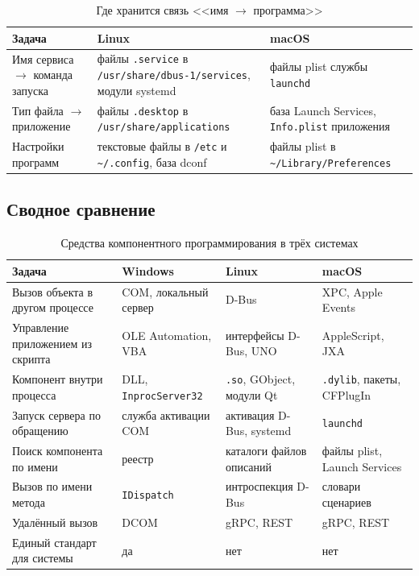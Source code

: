 \documentclass[14pt,a4paper]{extarticle}
\begin{document}
\begin{table}[H]
\caption{Где хранится связь <<имя $\rightarrow$ программа>>}
\label{tab:registry}
\centering
\small
\begin{tabularx}{\textwidth}{>{\raggedright\arraybackslash}p{3.4cm}LL}
\toprule
Задача & Linux & macOS \\
\midrule
Имя сервиса $\rightarrow$ команда запуска & файлы \texttt{.service} в
\texttt{/usr/\allowbreak share/\allowbreak dbus-1/\allowbreak services}, модули systemd & файлы plist службы
\texttt{launchd} \\
Тип файла $\rightarrow$ приложение & файлы \texttt{.desktop} в
\texttt{/usr/\allowbreak share/\allowbreak applications} & база Launch Services, \texttt{Info.plist}
приложения \\
Настройки программ & текстовые файлы в \texttt{/etc} и \texttt{\textasciitilde/.config},
база dconf & файлы plist в \texttt{\textasciitilde/Library/\allowbreak Preferences} \\
\bottomrule
\end{tabularx}
\end{table}

\subsection{Сводное сравнение}

\begin{table}[H]
\caption{Средства компонентного программирования в трёх системах}
\label{tab:os}
\centering
\small
\begin{tabularx}{\textwidth}{>{\raggedright\arraybackslash}p{3.6cm}LLL}
\toprule
Задача & Windows & Linux & macOS \\
\midrule
Вызов объекта в другом процессе & COM, локальный сервер & D-Bus & XPC, Apple Events \\
Управление приложением из скрипта & OLE Automation, VBA & интерфейсы D-Bus, UNO &
AppleScript, JXA \\
Компонент внутри процесса & DLL, \texttt{InprocServer32} & \texttt{.so}, GObject,
модули Qt & \texttt{.dylib}, пакеты, CFPlugIn \\
Запуск сервера по обращению & служба активации COM & активация D-Bus, systemd &
\texttt{launchd} \\
Поиск компонента по имени & реестр & каталоги файлов описаний & файлы plist, Launch
Services \\
Вызов по имени метода & \texttt{IDispatch} & интроспекция D-Bus & словари сценариев \\
Удалённый вызов & DCOM & gRPC, REST & gRPC, REST \\
Единый стандарт для системы & да & нет & нет \\
\bottomrule
\end{tabularx}
\end{table}
\end{document}
